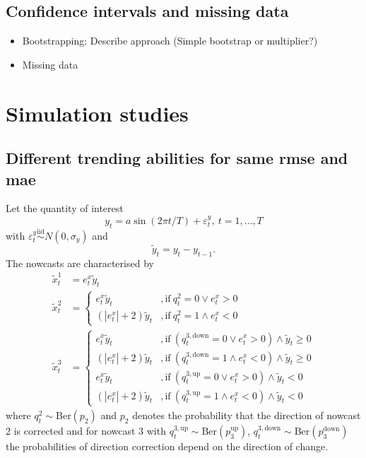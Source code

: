 \documentclass[oneside]{article}
\theoremstyle{plain}%
\theoremstyle{definition}
\newcommand{\ydiff}{\tilde{y}}
\newcommand{\xdiff}{\tilde{x}}
\begin{document}
\subsection{Confidence intervals and missing data}

\begin{itemize}
  \item Bootstrapping: Describe approach (Simple bootstrap or multiplier?)
  \item Missing data
\end{itemize}


\section{Simulation studies}

\subsection{Different trending abilities for same rmse and mae} \label{sec:simulation_rmse_mae}

Let the quantity of interest 
\begin{equation}
  y_t = a \sin(2 \pi t / T) + \varepsilon_t^y, \ t = 1, \dots, T
\end{equation}
with $\varepsilon_t^y \stackrel{\text{iid}}{\sim} N(0, \sigma_y)$ and 
\begin{equation}
  \ydiff_t = y_t - y_{t-1}.
\end{equation}
The nowcasts are characterised by 
\begin{align}
	\xdiff_t^1 &= e^x_t \ydiff_t \\
	\xdiff_t^2 &= \begin{cases}
		e^x_t \ydiff_t &, \text{if}\ q^2_t = 0 \lor e^x_t > 0\\
		(| e^x_t | + 2) \ydiff_t &, \text{if}\ q^2_t = 1 \land e^x_t < 0
	\end{cases} \\
	\xdiff_t^3 &= \begin{cases}
		e^x_t \ydiff_t &, \text{if}\ (q^{3, \text{down}}_t = 0 \lor e^x_t > 0) \land \ydiff_t \geq 0\\
		(| e^x_t | + 2) \ydiff_t &, \text{if}\ (q^{3, \text{down}}_t = 1 \land e^x_t < 0) \land \ydiff_t \geq 0 \\
		e^x_t \ydiff_t &, \text{if}\ (q^{3, \text{up}}_t = 0 \lor e^x_t > 0) \land \ydiff_t < 0\\
		(| e^x_t | + 2) \ydiff_t &, \text{if}\ (q^{3, \text{up}}_t = 1 \land e^x_t < 0) \land \ydiff_t < 0
	\end{cases}
\end{align}
where $q^2_t \sim \text{Ber}(p_2)$ and $p_2$ denotes the probability that the direction of nowcast 2 is corrected and for nowcast 3 with $q^{3, \text{up}}_t \sim \text{Ber}(p_3^{\text{up}})$, $q^{3, \text{down}}_t \sim \text{Ber}(p_3^{\text{down}})$ the probabilities of direction correction depend on the direction of change.
\end{document}

